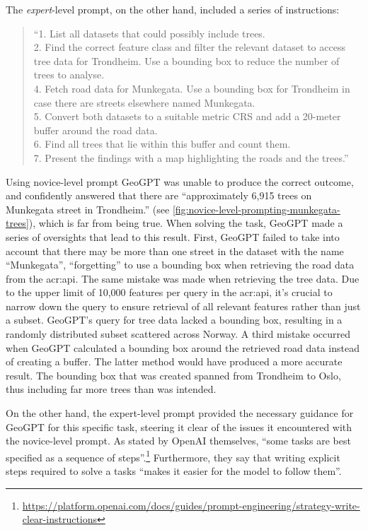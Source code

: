 \noindent The \textit{expert}-level prompt, on the other hand, included a series of instructions:

\begin{quote}
    \enquote{1. List all datasets that could possibly include trees. \\
        2. Find the correct feature class and filter the relevant dataset to access tree data for Trondheim. Use a bounding box to reduce the number of trees to analyse. \\
        4. Fetch road data for Munkegata. Use a bounding box for Trondheim in case there are streets elsewhere named Munkegata. \\
        5. Convert both datasets to a suitable metric CRS and add a 20-meter buffer around the road data. \\
        6. Find all trees that lie within this buffer and count them. \\
        7. Present the findings with a map highlighting the roads and the trees.}
\end{quote}

Using novice-level prompt GeoGPT was unable to produce the correct outcome, and confidently answered that there are \enquote{approximately 6,915 trees on Munkegata street in Trondheim.} (see \autoref{fig:novice-level-prompting-munkegata-trees}), which is far from being true. When solving the task, GeoGPT made a series of oversights that lead to this result. First, GeoGPT failed to take into account that there may be more than one street in the dataset with the name \enquote{Munkegata}, \enquote{forgetting} to use a bounding box when retrieving the road data from the \acrshort{acr:api}. The same mistake was made when retrieving the tree data. Due to the upper limit of 10,000 features per query in the \acrshort{acr:api}, it's crucial to narrow down the query to ensure retrieval of all relevant features rather than just a subset. GeoGPT's query for tree data lacked a bounding box, resulting in a randomly distributed subset scattered across Norway. A third mistake occurred when GeoGPT calculated a bounding box around the retrieved road data instead of creating a buffer. The latter method would have produced a more accurate result. The bounding box that was created spanned from Trondheim to Oslo, thus including far more trees than was intended.

On the other hand, the expert-level prompt provided the necessary guidance for GeoGPT for this specific task, steering it clear of the issues it encountered with the novice-level prompt. As stated by OpenAI themselves, \enquote{some tasks are best specified as a sequence of steps}.\footnote{\url{https://platform.openai.com/docs/guides/prompt-engineering/strategy-write-clear-instructions}} Furthermore, they say that writing explicit steps required to solve a tasks \enquote{makes it easier for the model to follow them}.

